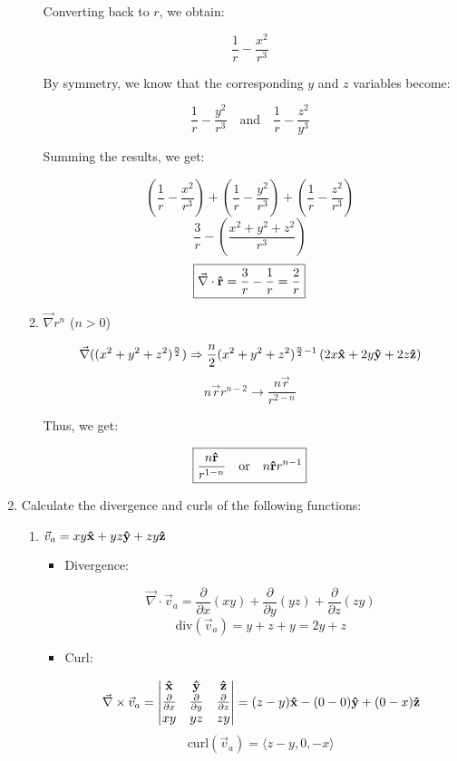 \begin{enumerate}
\begin{enumerate}
        Converting back to $r$, we obtain:

        $$\frac{1}{r}-\frac{x^2}{r^3}$$

        By symmetry, we know that the corresponding $y$ and $z$ variables become:

        $$\frac{1}{r}-\frac{y^2}{r^3}\quad\text{and}\quad\frac{1}{r}-\frac{z^2}{y^3}$$

        Summing the results, we get:

        $$\left( \frac{1}{r}-\frac{x^2}{r^3} \right)+\left( \frac{1}{r}-\frac{y^2}{r^3} \right)+\left( \frac{1}{r}-\frac{z^2}{r^3} \right)$$
        $$\frac{3}{r}-\left( \frac{x^2+y^2+z^2}{r^3} \right)$$
        $$\boxed{\vec{\nabla}\cdot\bold{\hat{r}}=\frac{3}{r}-\frac{1}{r}=\frac{2}{r}}$$

      \item $\vec{\nabla}r^n$ ($n>0$)

        $$\vec{\nabla}((x^2+y^2+z^2)^\frac{n}{2})\Rightarrow \frac{n}{2}(x^2+y^2+z^2)^{\frac{n}{2}-1}\left( 2x\bold{\hat{x}}+2y\bold{\hat{y}}+2z\bold{\hat{z}} \right)$$
        $$n\vec{r}r^{n-2}\rightarrow \frac{n\vec{r}}{r^{2-n}}$$

        Thus, we get:

        $$\boxed{\frac{n\bold{\hat{r}}}{r^{1-n}}\quad\text{or}\quad n\bold{\hat{r}}r^{n-1}}$$

    \end{enumerate}

  \item Calculate the divergence and curls of the following functions:

    \begin{enumerate}

      \item $\vec{v}_a=xy\bold{\hat{x}}+yz\bold{\hat{y}}+zy\bold{\hat{z}}$

        \begin{itemize}

          \item Divergence:

            $$\vec{\nabla}\cdot \vec{v}_a=\frac{\partial}{\partial x}(xy)+\frac{\partial}{\partial y}(yz)+\frac{\partial}{\partial z}(zy)$$
            $$\boxed{\text{div}(\vec{v}_a)=y+z+y=2y+z}$$

          \item Curl:

            $$\vec{\nabla}\times\vec{v}_a=\left|\begin{matrix} \bold{\hat{x}} & \bold{\hat{y}} & \bold{\hat{z}}\\ \frac{\partial}{\partial x} & \frac{\partial}{\partial y} & \frac{\partial}{\partial z} \\ xy & yz & zy \end{matrix}\right|=(z-y)\bold{\hat{x}}-(0-0)\bold{\hat{y}}+(0-x)\bold{\hat{z}}$$
            $$\boxed{\text{curl}(\vec{v}_a)=\langle z-y, 0, -x\rangle}$$


\end{itemize}
\end{enumerate}
\end{enumerate}
